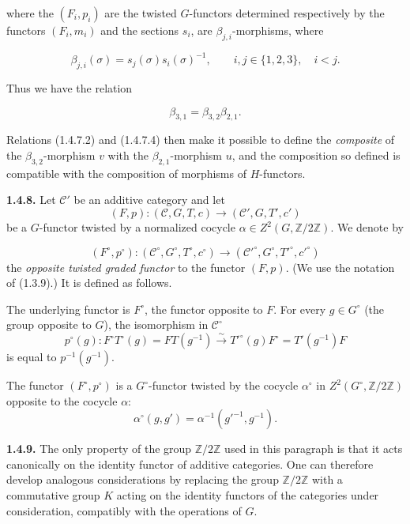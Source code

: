 %
where the $(F_i,p_i)$ are the twisted $G$-functors determined
respectively by the functors $(F_i,m_i)$ and the sections $s_i$, are
$\beta_{j,i}$-morphisms, where

\begin{equation}
  \beta_{j,i}(\sigma)=s_j(\sigma)s_i(\sigma)^{-1},
  \qquad i,j\in\{1,2,3\},\quad i<j.
  \tag{1.4.7.3}
\end{equation}

Thus we have the relation

\begin{equation}
  \beta_{3,1}=\beta_{3,2}\beta_{2,1}.
  \tag{1.4.7.4}
\end{equation}

Relations (1.4.7.2) and (1.4.7.4) then make it possible to define the
\emph{composite} of the $\beta_{3,2}$-morphism $v$ with the
$\beta_{2,1}$-morphism $u$, and the composition so defined is
compatible with the composition of morphisms of $H$-functors.

\noindent\textbf{1.4.8.}\quad
Let $\mathcal C'$ be an additive category and let
\[
  (F,p)\colon(\mathcal C,G,T,c)\longrightarrow
  (\mathcal C',G,T',c')
\]
be a $G$-functor twisted by a normalized cocycle
$\alpha\in Z^2(G,\mathbb Z/2\mathbb Z)$. We denote by

\begin{equation}
  (F^{\circ},p^{\circ})\colon
  (\mathcal C^{\circ},G^{\circ},T^{\circ},c^{\circ})
  \longrightarrow
  (\mathcal C'^{\circ},G^{\circ},T'^{\circ},c'^{\circ})
  \tag{1.4.8.1}
\end{equation}
the \emph{opposite twisted graded functor} to the functor $(F,p)$.
(We use the notation of (1.3.9).) It is defined as follows.

The underlying functor is $F^{\circ}$, the functor opposite to $F$.
For every $g\in G^{\circ}$ (the group opposite to $G$), the
isomorphism in $\mathcal C^{\circ}$
\[
  p^{\circ}(g)\colon
  F^{\circ}T^{\circ}(g)=FT(g^{-1})
  \overset{\sim}{\longrightarrow}
  T'^{\circ}(g)F^{\circ}=T'(g^{-1})F
\]
is equal to $p^{-1}(g^{-1})$.

The functor $(F^{\circ},p^{\circ})$ is a $G^{\circ}$-functor twisted
by the cocycle $\alpha^{\circ}$ in
$Z^2(G^{\circ},\mathbb Z/2\mathbb Z)$ opposite to the cocycle
$\alpha$:
\[
  \alpha^{\circ}(g,g')=\alpha^{-1}(g'^{-1},g^{-1}).
\]

\noindent\textbf{1.4.9.}\quad
The only property of the group $\mathbb Z/2\mathbb Z$ used in this
paragraph is that it acts canonically on the identity functor of
additive categories. One can therefore develop analogous
considerations by replacing the group $\mathbb Z/2\mathbb Z$ with a
commutative group $K$ acting on the identity functors of the categories
under consideration, compatibly with the operations of $G$.

